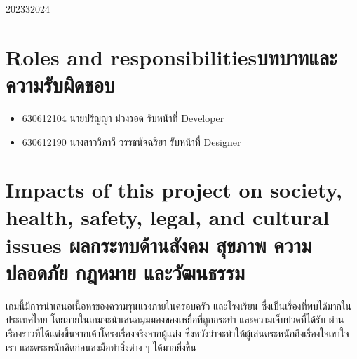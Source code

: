 \begin{plan}{6}{2023}{3}{2024}
\end{plan}

\newpage
\section{\ifenglish Roles and responsibilities\else บทบาทและความรับผิดชอบ\fi}
\begin{itemize}
    \item[] 630612104 นายปริญญา ม่วงรอด รับหน้าที่ Developer
    \item[] 630612190 นางสาววิภาวี วรรธนัจฉริยา รับหน้าที่ Designer
\end{itemize}

\section{\ifenglish%
      Impacts of this project on society, health, safety, legal, and cultural issues
  \else%
      ผลกระทบด้านสังคม สุขภาพ ความปลอดภัย กฎหมาย และวัฒนธรรม
  \fi}
  เกมนี้มีการนำเสนอเนื้อหาของความรุนแรงภายในครอบครัว และโรงเรียน ซึ่งเป็นเรื่องที่พบได้มากในประเทศไทย 
  โดยภายในเกมจะนำเสนอมุมมองของเหยื่อที่ถูกกระทำ และความเจ็บปวดที่ได้รับ ผ่านเรื่องราวที่ได้แต่งขึ้นจากเค้าโครงเรื่องจริงจากผู้แต่ง
  ซึ่งหวังว่าจะทำให้ผู้เล่นตระหนักถึงเรื่องใจเขาใจเรา และตระหนักคิดก่อนลงมือทำสิ่งต่าง ๆ ได้มากยิ่งขึ้น


